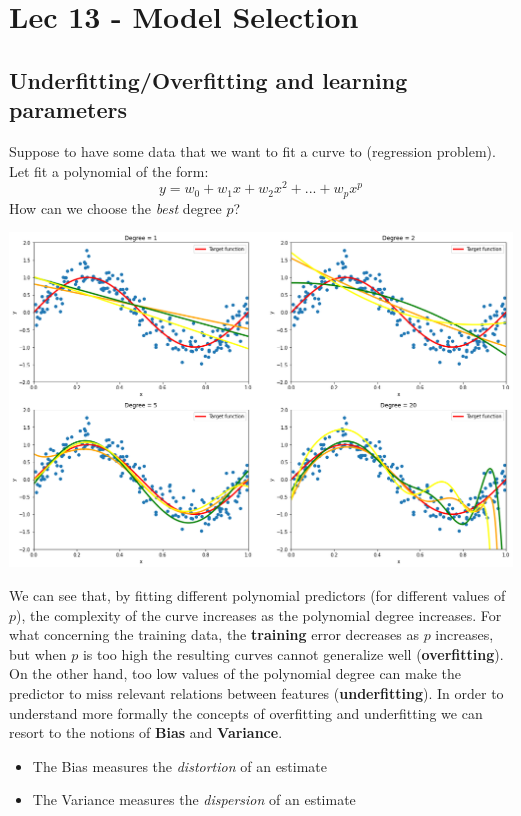 \chapter{Lec 13 - Model Selection}

\section{Underfitting/Overfitting and learning parameters}
Suppose to have some data that we want to fit a curve to (regression problem). Let fit a polynomial of the form:
\[y = w_{0} + w_{1}x + w_{2}x^{2} + ... + w_{p}x^{p}\]
How can we choose the \textit{best} degree $p$?
\begin{center}
    \includegraphics[scale = 0.35]{images/Model sel.png}
\end{center}
We can see that, by fitting different polynomial predictors (for different values of $p$), the complexity of the curve increases as the polynomial degree increases. For what concerning the training data, the \textbf{training} error decreases as $p$ increases, but when $p$ is too high the resulting curves cannot generalize well (\textbf{overfitting}). On the other hand, too low values of the polynomial degree can make the predictor to miss relevant relations between features (\textbf{underfitting}).\newline\newline
In order to understand more formally the concepts of overfitting and underfitting we can resort to the notions of \textbf{Bias} and \textbf{Variance}.
\begin{itemize}
    \item The Bias measures the \textit{distortion} of an estimate
    \item The Variance measures the \textit{dispersion} of an estimate
\end{itemize}
